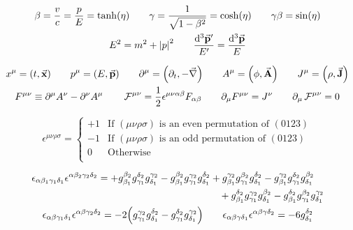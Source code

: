 \begin{gather*}
        \beta
        = \frac{v}{c}
        = \frac{p}{E}
        = \tanh(\eta)
        \qquad
        \gamma
        = \frac{1}{\sqrt{1-\beta^2}}
        = \cosh(\eta)
        \qquad
        \gamma\beta = \sin(\eta)
        \\
        E^2 = m^2 + \abs{p}^2
        \qquad
        \frac{\dd[3]{\va{p}'}}{E'} = \frac{\dd[3]{\va{p}}}{E}
\end{gather*}

\begin{gather*}
        x^{\mu} = (t, \va{x})
        \qquad
        p^{\mu} = (E, \va{p})
        \qquad
        \partial^{\mu} = \qty(\partial_t, -\va{\nabla})
        \qquad
        A^{\mu} = \qty(\phi, \va{A})
        \qquad
        J^{\mu} = \qty(\rho, \va{J})
        \\
        F^{\mu\nu} \equiv \partial^\mu A^\nu - \partial^\nu A^\mu
        \qquad
        \operatorname{\mathcal{F}}^{\mu\nu} = \frac{1}{2}\epsilon^{\mu\nu\alpha\beta}F_{\alpha\beta}
        \qquad
        \partial_\mu F^{\mu\nu} = J^{\nu}
        \qquad
        \partial_\mu \operatorname{\mathcal{F}}^{\mu\nu} = 0
\end{gather*}

\begin{equation*}
        \epsilon^{\mu\nu\rho\sigma} = \begin{cases}
                +1 &\text{If $(\mu\nu\rho\sigma)$ is an even permutation of $(0123)$} \\
                -1 &\text{If $(\mu\nu\rho\sigma)$ is an odd permutation of $(0123)$} \\
                0  &\text{Otherwise} \\
        \end{cases}
\end{equation*}

\begin{gather*}
    \begin{multlined}
        \epsilon_{\alpha\beta_1\gamma_1\delta_1}\epsilon^{\alpha\beta_2\gamma_2\delta_2}
        =
        + g^{\beta_2}_{\beta_1}g^{\delta_2}_{\gamma_1}g^{\gamma_2}_{\delta_1}
        - g^{\beta_2}_{\beta_1}g^{\gamma_2}_{\gamma_1}g^{\delta_2}_{\delta_1}
        + g^{\gamma_2}_{\beta_1}g^{\beta_2}_{\gamma_1}g^{\delta_2}_{\delta_1}
        - g^{\gamma_2}_{\beta_1}g^{\delta_2}_{\gamma_1}g^{\beta_2}_{\delta_1}
        \\
        + g^{\delta_2}_{\beta_1}g^{\gamma_2}_{\gamma_1}g^{\beta_2}_{\delta_1}
        - g^{\delta_2}_{\beta_1}g^{\beta_2}_{\gamma_1}g^{\gamma_2}_{\delta_1}
    \end{multlined}
    \\
    \epsilon_{\alpha\beta\gamma_1\delta_1}\epsilon^{\alpha\beta\gamma_2\delta_2} = -2\qty(g_{\gamma_1}^{\gamma_2}g_{\delta_1}^{\delta_2} - g_{\gamma_1}^{\delta_2}g_{\delta_1}^{\gamma_2})
    \qquad
    \epsilon_{\alpha\beta\gamma\delta_1}\epsilon^{\alpha\beta\gamma\delta_2} = -6g_{\delta_1}^{\delta_2}
\end{gather*}
